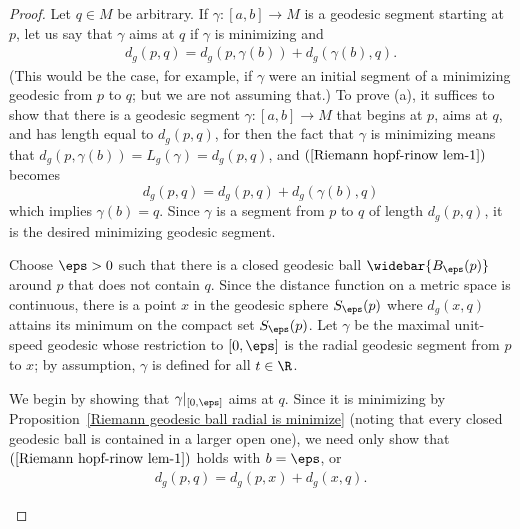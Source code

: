 \begin{proof}
Let $q\in M$ be arbitrary. If $\gamma:[a,b]\to M$ is a geodesic segment starting at $p$, let us say that $\gamma$ aims at $q$ if $\gamma$ is minimizing and
\begin{align}\label{Riemann hopf-rinow lem-1}
d_g(p,q)=d_g(p,\gamma(b))+d_g(\gamma(b),q).
\end{align}
(This would be the case, for example, if $\gamma$ were an initial segment of a minimizing geodesic from $p$ to $q$; but we are not assuming that.) To prove (a), it 
suffices to show that there is a geodesic segment $\gamma:[a,b]\to M$ that begins at $p$, aims at $q$, and has length equal to $d_g(p,q)$, for then the fact that $\gamma$ 
is minimizing means that $d_g(p,\gamma(b))=L_g(\gamma)=d_g(p,q)$, and $(\ref{Riemann hopf-rinow lem-1})$ becomes
\[d_g(p,q)=d_g(p,q)+d_g(\gamma(b),q)\]
which implies $\gamma(b)=q$. Since $\gamma$ is a segment from $p$ to $q$ of length $d_g(p,q)$, it is the desired minimizing geodesic segment.\par
Choose $\eps>0$ such that there is a closed geodesic ball $\widebar{B_\eps(p)}$ around $p$ that does not contain $q$. Since the distance function on a metric space is 
continuous, there is a point $x$ in the geodesic sphere $S_\eps(p)$ where $d_g(x,q)$ attains its minimum on the compact set $S_\eps(p)$. Let $\gamma$ be the maximal 
unit-speed geodesic whose restriction to $[0,\eps]$ is the radial geodesic segment from $p$ to $x$; by assumption, $\gamma$ is defined for all $t\in\R$.\par
We begin by showing that $\gamma|_{[0,\eps]}$ aims at $q$. Since it is minimizing by Proposition~\ref{Riemann geodesic ball radial is minimize} (noting that every closed 
geodesic ball is contained in a larger open one), we need only show that $(\ref{Riemann hopf-rinow lem-1})$ holds with $b=\eps$, or
\begin{align}\label{Riemann hopf-rinow lem-2}
d_g(p,q)=d_g(p,x)+d_g(x,q).
\end{align}
\begin{figure}[htbp]
\centering

\end{figure}
\end{proof}
